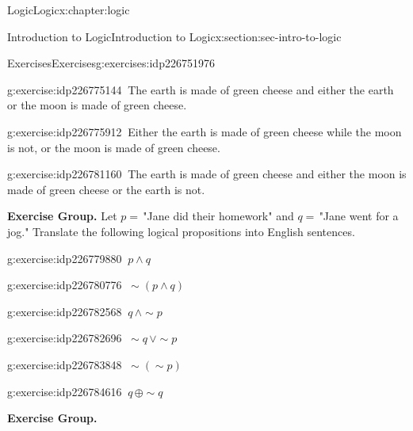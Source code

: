 \documentclass[twoside,10pt,]{book}
\numberwithin{equation}{section}
\begin{document}
\begin{chapterptx}{Logic}{}{Logic}{}{}{x:chapter:logic}
\begin{sectionptx}{Introduction to Logic}{}{Introduction to Logic}{}{}{x:section:sec-intro-to-logic}
\begin{exercises-subsection}{Exercises}{}{Exercises}{}{}{g:exercises:idp226751976}
\begin{exercisegroup}
\begin{divisionexerciseeg}{18}{}{}{g:exercise:idp226775144}%
\(\ \)The earth is made of green cheese and either the earth or the moon is made of green cheese.\end{divisionexerciseeg}%
\begin{divisionexerciseeg}{19}{}{}{g:exercise:idp226775912}%
\(\ \)Either the earth is made of green cheese while the moon is not, or the moon is made of green cheese.\end{divisionexerciseeg}%
\begin{divisionexerciseeg}{20}{}{}{g:exercise:idp226781160}%
\(\ \)The earth is made of green cheese and either the moon is made of green cheese or the earth is not.\end{divisionexerciseeg}%
\end{exercisegroup}
\par\medskip\noindent
\par\medskip\noindent%
\textbf{Exercise Group.}\space\space%
Let \(p=\,\)"Jane did their homework" and \(q=\,\)"Jane went for a jog."  Translate the following logical propositions into English sentences.\begin{exercisegroup}
\begin{divisionexerciseeg}{21}{}{}{g:exercise:idp226779880}%
\(\ p{\wedge} q\)\end{divisionexerciseeg}%
\begin{divisionexerciseeg}{22}{}{}{g:exercise:idp226780776}%
\(\ \sim\!(p{\wedge} q)\)\end{divisionexerciseeg}%
\begin{divisionexerciseeg}{23}{}{}{g:exercise:idp226782568}%
\(\ q\,{\wedge}\sim\!{p}\)\end{divisionexerciseeg}%
\begin{divisionexerciseeg}{24}{}{}{g:exercise:idp226782696}%
\(\ \sim\!{q}\,{\vee} \sim\!{p}\)\end{divisionexerciseeg}%
\begin{divisionexerciseeg}{25}{}{}{g:exercise:idp226783848}%
\(\ \sim\!(\sim\!{p})\)\end{divisionexerciseeg}%
\begin{divisionexerciseeg}{26}{}{}{g:exercise:idp226784616}%
\(\ q\,{\oplus}\sim\!{q}\)\end{divisionexerciseeg}%
\end{exercisegroup}
\par\medskip\noindent
\par\medskip\noindent%
\textbf{Exercise Group.}\space\space%

\end{exercises-subsection}
\end{sectionptx}
\end{chapterptx}
\end{document}
